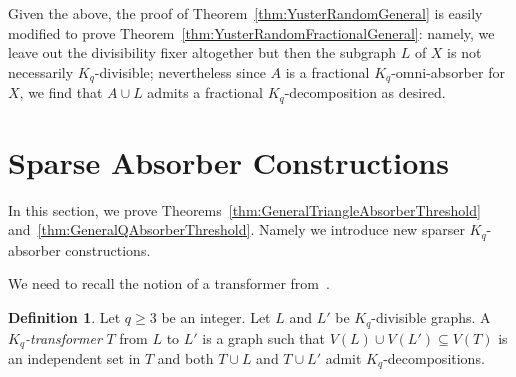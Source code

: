 \documentclass[11pt]{article}
\numberwithin{equation}{section}
\newcounter{i}
\theoremstyle{plain}
\theoremstyle{plain} %
\theoremstyle{definition}
\newtheorem{definition}[thm]{Definition}
\begin{document}
Given the above, the proof of Theorem~\ref{thm:YusterRandomGeneral} is easily modified to prove Theorem~\ref{thm:YusterRandomFractionalGeneral}: namely, we leave out the divisibility fixer altogether but then the subgraph $L$ of $X$ is not necessarily $K_q$-divisible; nevertheless since $A$ is a fractional $K_q$-omni-absorber for $X$, we find that $A\cup L$ admits a fractional $K_q$-decomposition as desired. 

\section{Sparse Absorber Constructions}\label{s:Construction}

In this section, we prove Theorems~\ref{thm:GeneralTriangleAbsorberThreshold} and~\ref{thm:GeneralQAbsorberThreshold}. Namely we introduce new sparser $K_q$-absorber constructions. 






We need to recall the notion of a transformer from~\cite{BKLO16}.

\begin{definition}
Let $q\ge 3$ be an integer. Let $L$ and $L'$ be $K_q$-divisible graphs. A \emph{$K_q$-transformer} $T$ from $L$ to $L'$ is a graph such that $V(L)\cup V(L')\subseteq V(T)$ is an independent set in $T$ and both $T\cup L$ and $T\cup L'$ admit $K_q$-decompositions.     
\end{definition}
\end{document}
